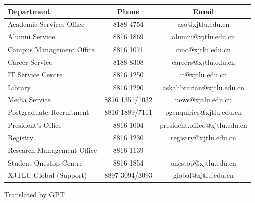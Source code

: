 \begin{table}[H]
    \begin{tabular}{p{60mm}cc}
        \hline
        Department & Phone & Email \\ \hline
        Academic Services Office & 8188 4754 & aso@xjtlu.edu.cn \\ \hline
        Alumni Service & 8816 1869 & alumni@xjtlu.edu.cn \\ \hline
        Campus Management Office & 8816 1071 & cmo@xjtlu.edu.cn \\ \hline
        Career Service & 8188 8308 & careers@xjtlu.edu.cn \\ \hline
        IT Service Centre & 8816 1250 & it@xjtlu.edu.cn \\ \hline
        Library & 8816 1290 & askalibrarian@xjtlu.edu.cn \\ \hline
        Media Service & 8816 1351/1032 & news@xjtlu.edu.cn \\ \hline
        Postgraduate Recruitment & 8816 1889/7111 & pgenquiries@xjtlu.edu.cn \\ \hline
        President's Office & 8816 1004 & president.office@xjtlu.edu.cn \\ \hline
        Registry & 8816 1230 & registry@xjtlu.edu.cn \\ \hline
        Research Management Office & 8816 1139 &  \\ \hline
        Student Onestop Centre & 8816 1854 & onestop@xjtlu.edu.cn \\ \hline
        XJTLU Global (Support) & 8897 3094/3093 & global@xjtlu.edu.cn \\ \hline
    \end{tabular}
\end{table}

\begin{flushright}
    Translated by GPT
\end{flushright}
